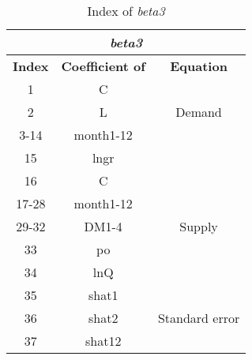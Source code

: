 \documentclass[12pt]{article}
\begin{document}
\begin{table}[h]
\centering
\caption{Index of \textit{beta3}} 
\vspace{3mm}
\begin{tabular}{c|c|c}
\hline
\multicolumn{3}{c}{\textbf{\textit{beta3}}}         \\ \hline
\textbf{Index} & \textbf{Coefficient of} & \textbf{Equation} \\ \hline
1     & C              &          \\
2     & L              & Demand   \\
3-14  & month1-12      &          \\
15    & lngr           &          \\ \hline
16    & C              &          \\
17-28 & month1-12      &          \\
29-32 & DM1-4          & Supply   \\
33    & po             &          \\
34    & lnQ            &          \\ \hline
35    & shat1          &          \\
36    & shat2          & Standard error     \\
37    & shat12         &          \\
\hline
\end{tabular}
\end{table}
\end{document}
